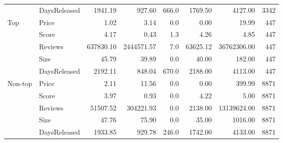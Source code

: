 \begin{longtable}[h!]{llrrrrrr}
        & DaysReleased &    1941.19 &      927.60 &  666.0 &    1769.50 &      4127.00 &   3342 \\
\cline{1-8}
\multirow{5}{*}{Top} & Price &       1.02 &        3.14 &    0.0 &       0.00 &        19.99 &    447 \\
        & Score &       4.17 &        0.43 &    1.3 &       4.26 &         4.85 &    447 \\
        & Reviews &  637830.10 &  2444571.57 &    7.0 &   63625.12 &  36762306.00 &    447 \\
        & Size &      45.79 &       39.89 &    0.0 &      40.00 &       182.00 &    447 \\
        & DaysReleased &    2192.11 &      848.04 &  670.0 &    2188.00 &      4113.00 &    447 \\
\cline{1-8}
\multirow{5}{*}{Non-top} & Price &       2.11 &       11.56 &    0.0 &       0.00 &       399.99 &   8871 \\
        & Score &       3.97 &        0.93 &    0.0 &       4.22 &         5.00 &   8871 \\
        & Reviews &   51507.52 &   304221.93 &    0.0 &    2138.00 &  13139624.00 &   8871 \\
        & Size &      47.76 &       75.90 &    0.0 &      35.00 &      1016.00 &   8871 \\
        & DaysReleased &    1933.85 &      929.78 &  246.0 &    1742.00 &      4133.00 &   8871 \\
\end{longtable}
